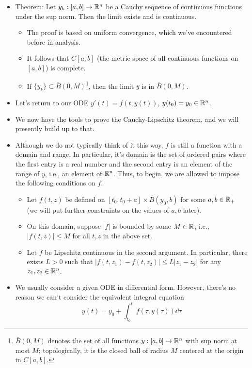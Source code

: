 \documentclass[../notes.tex]{subfiles}
\begin{document}
\begin{itemize}
\begin{itemize}
    \end{itemize}
    \item Theorem: Let $y_k:[a,b]\to\mathbb{R}^n$ be a Cauchy sequence of continuous functions under the sup norm. Then the limit exists and is continuous.
    \begin{itemize}
        \item The proof is based on uniform convergence, which we've encountered before in analysis.
        \item It follows that $C[a,b]$ (the metric space of all continuous functions on $[a,b]$) is complete.
        \item If $\{y_k\}\subset\bar{B}(0,M)$\footnote{$\bar{B}(0,M)$ denotes the set of all functions $y:[a,b]\to\mathbb{R}^n$ with sup norm at most $M$; topologically, it is the closed ball of radius $M$ centered at the origin in $C[a,b]$.}, then the limit $y$ is in $\bar{B}(0,M)$.
    \end{itemize}
    \item Let's return to our ODE $y'(t)=f(t,y(t))$, $y(t_0)=y_0\in\mathbb{R}^n$.
    \item We now have the tools to prove the Cauchy-Lipschitz theorem, and we will presently build up to that.
    \item Although we do not typically think of it this way, $f$ is still a function with a domain and range. In particular, it's domain is the set of ordered pairs where the first entry is a real number and the second entry is an element of the range of $y$, i.e., an element of $\mathbb{R}^n$. Thus, to begin, we are allowed to impose the following conditions on $f$.
    \begin{itemize}
        \item Let $f(t,z)$ be defined on $[t_0,t_0+a]\times\bar{B}(y_0,b)$ for some $a,b\in\mathbb{R}_+$ (we will put further constraints on the values of $a,b$ later).
        \item On this domain, suppose $|f|$ is bounded by some $M\in\mathbb{R}$, i.e., $|f(t,z)|\leq M$ for all $t,z$ in the above set.
        \item Let $f$ be Lipschitz continuous in the second argument. In particular, there exists $L>0$ such that $|f(t,z_1)-f(t,z_2)|\leq L|z_1-z_2|$ for any $z_1,z_2\in\mathbb{R}^n$.
    \end{itemize}
    \item We usually consider a given ODE in differential form. However, there's no reason we can't consider the equivalent integral equation
    \begin{equation*}
        y(t) = y_0+\int_{t_0}^tf(\tau,y(\tau))\dd\tau

\end{equation*}
\end{itemize}
\end{document}
